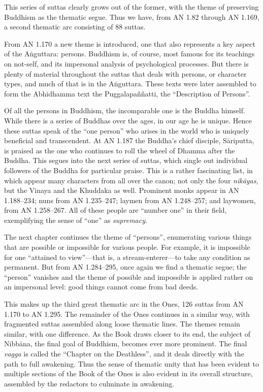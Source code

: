 \documentclass[12pt,openany]{book}%
\begin{document}
This series of suttas clearly grows out of the former, with the theme of preserving Buddhism as the thematic segue. Thus we have, from AN 1.82 through AN 1.169, a second thematic arc consisting of 88 suttas.

From AN 1.170 a new theme is introduced, one that also represents a key aspect of the \textsanskrit{Aṅguttara}: persons. Buddhism is, of course, most famous for its teachings on not-self, and its impersonal analysis of psychological processes. But there is plenty of material throughout the suttas that deals with persons, or character types, and much of that is in the \textsanskrit{Aṅguttara}. These texts were later assembled to form the Abhidhamma text the \textsanskrit{Puggalapaññatti}, the “Description of Persons”.

Of all the persons in Buddhism, the incomparable one is the Buddha himself. While there is a series of Buddhas over the ages, in our age he is unique. Hence these suttas speak of the “one person” who arises in the world who is uniquely beneficial and transcendent. At AN 1.187 the Buddha’s chief disciple, \textsanskrit{Sāriputta}, is praised as the one who continues to roll the wheel of Dhamma after the Buddha. This segues into the next series of suttas, which single out individual followers of the Buddha for particular praise. This is a rather fascinating list, in which appear many characters from all over the canon; not only the four \textit{\textsanskrit{nikāyas}}, but the Vinaya and the Khuddaka as well. Prominent monks appear in AN 1.188–234; nuns from AN 1.235–247; laymen from AN 1.248–257; and laywomen, from AN 1.258–267. All of these people are “number one” in their field, exemplifying the sense of “one” as \emph{supremacy}.

The next chapter continues the theme of “persons”, enumerating various things that are possible or impossible for various people. For example, it is impossible for one “attained to view”—that is, a stream-enterer—to take any condition as permanent. But from AN 1.284–295, once again we find a thematic segue; the “person” vanishes and the theme of possible and impossible is applied rather on an impersonal level: good things cannot come from bad deeds.

This makes up the third great thematic arc in the Ones, 126 suttas from AN 1.170 to AN 1.295. The remainder of the Ones continues in a similar way, with fragmented suttas assembled along loose thematic lines. The themes remain similar, with one difference. As the Book draws closer to its end, the subject of \textsanskrit{Nibbāna}, the final goal of Buddhism, becomes ever more prominent. The final \textit{vagga} is called the “Chapter on the Deathless”, and it deals directly with the path to full awakening. Thus the sense of thematic unity that has been evident to multiple sections of the Book of the Ones is also evident in its overall structure, assembled by the redactors to culminate in awakening.
\end{document}
